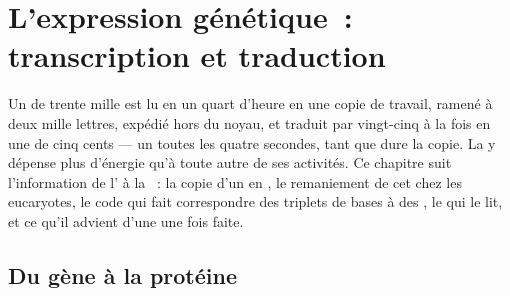 \chapter{L'expression génétique~: transcription et traduction}\label{ch:b1:gene-expression}

Un  de trente mille  est lu en un quart d'heure en
une copie de travail, ramené à deux mille lettres, expédié hors du
noyau, et traduit par vingt-cinq  à la fois en une  de
cinq cents  --- un toutes les quatre secondes, tant que
dure la copie. La  y dépense plus d'énergie qu'à toute autre de
ses activités. Ce chapitre suit l'information de l' à la ~:
la copie d'un  en , le remaniement de cet  chez les
eucaryotes, le code qui fait correspondre des triplets de bases à des
, le  qui le lit, et ce qu'il advient d'une
 une fois faite.

\section{Du gène à la protéine}

